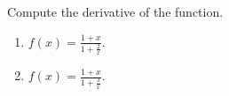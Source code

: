 Compute the derivative of the function.
\begin{enumerate}[ref={\fcProblemRef}]
\item $\displaystyle f(x)=\frac{1+x }{1+\frac{2}x}$. 


\item $\displaystyle f(x)=\frac{1+x }{1+\frac{3}x}$. 

\end{enumerate}
